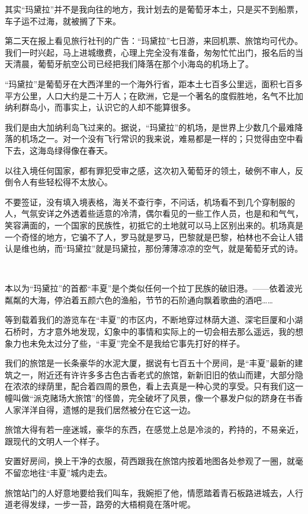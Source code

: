 \par 其实“玛黛拉”并不是我向往的地方，我计划去的是葡萄牙本土，只是买不到船票，车子运不过海，就被搁了下来。
\par 第二天在报上看见旅行社刊的广告：“玛黛拉”七日游，来回机票、旅馆均可代办。我们一时兴起，马上进城缴费，心理上完全没有准备，匆匆忙忙出门，报名后的当天清晨，葡萄牙航空公司已经把我们降落在那个小海岛的机场上了。
\par “玛黛拉”是葡萄牙在大西洋里的一个海外行省，距本土七百多公里远，面积七百多平方公里，人口大约是二十万人；在欧洲，它是一个著名的度假胜地，名气不比加纳利群岛小，而事实上，认识它的人却不能算很多。
\par 我们是由大加纳利岛飞过来的。据说，“玛黛拉”的机场，是世界上少数几个最难降落的机场之一。对一个没有飞行常识的我来说，难易都是一样的；只觉得由空中看下去，这海岛绿得像在春天。
\par 以往入境任何国家，都有罪犯受审之感，这次初入葡萄牙的领土，破例不审人，反倒令人有些轻松得不太放心。
\par 不要签证，没有填入境表格，海关不查行李，不问话，机场看不到几个穿制服的人，气氛安详之外透着些适意的冷清，偶尔看见的一些工作人员，也是和和气气，笑容满面的，一个国家的民族性，初抵它的土地就可以马上区别出来的。机场真是一个奇怪的地方，它骗不了人，罗马就是罗马，巴黎就是巴黎，柏林也不会让人错认是维也纳，而“玛黛拉”就是玛黛拉，那份薄薄凉凉的空气，就是葡萄牙式的诗。
\par  
\par 本以为“玛黛拉”的首都“丰夏”是个类似任何一个拉丁民族的破旧港。——依着波光粼粼的大海，停泊着五颜六色的渔船，节节的石阶通向飘着歌曲的酒吧……
\par 等到载着我们的游览车在“丰夏”的市区内，不断地穿过林荫大道、深宅巨厦和小湖石桥时，方才意外地发现，幻象中的事情和实际上的一切会相去那么遥远，我的想象力也未免太过分了些，“丰夏”完全不是我给它事先打好的样子。
\par 我们的旅馆是一长条豪华的水泥大厦，据说有七百五十个房间，是“丰夏”最新的建筑之一，附近还有许许多多古色古香老式的旅馆，新新旧旧的依山而建，大部分隐在浓浓的绿荫里，配合着四周的景色，看上去真是一种心灵的享受。只有我们这一幢叫做“派克赌场大旅馆”的怪兽，完全破坏了风景，像一个暴发户似的跻身在书香人家洋洋自得，遗憾的是我们居然被分在它这一边。
\par 旅馆大得有若一座迷城，豪华的东西，在感觉上总是冷淡的，矜持的，不易亲近，跟现代的文明人一个样子。
\par 安置好房间，换上干净的衣服，荷西跟我在旅馆内按着地图各处参观了一圈，就毫不留恋地往“丰夏”城内走去。
\par 旅馆站门的人好意地要给我们叫车，我婉拒了他，情愿踏着青石板路进城去，人行道老得发绿，一步一苔，路旁的大梧桐竟在落叶呢。
